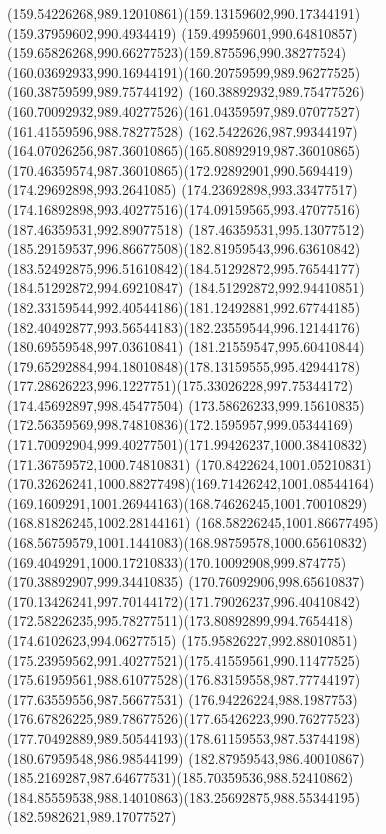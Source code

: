 {    \curveto(159.54226268,989.12010861)(159.13159602,990.17344191)(159.37959602,990.4934419)
    \curveto(159.49959601,990.64810857)(159.65826268,990.66277523)(159.875596,990.38277524)
    \curveto(160.03692933,990.16944191)(160.20759599,989.96277525)(160.38759599,989.75744192)
    \lineto(160.38892932,989.75477526)
    \curveto(160.70092932,989.40277526)(161.04359597,989.07077527)(161.41559596,988.78277528)
    \curveto(162.5422626,987.99344197)(164.07026256,987.36010865)(165.80892919,987.36010865)
    \curveto(170.46359574,987.36010865)(172.92892901,990.5694419)(174.29692898,993.2641085)
    \curveto(174.23692898,993.33477517)(174.16892898,993.40277516)(174.09159565,993.47077516)
    \moveto(187.46359531,992.89077518)
    \curveto(187.46359531,995.13077512)(185.29159537,996.86677508)(182.81959543,996.63610842)
    \curveto(183.52492875,996.51610842)(184.51292872,995.76544177)(184.51292872,994.69210847)
    \curveto(184.51292872,992.94410851)(182.33159544,992.40544186)(181.12492881,992.67744185)
    \curveto(182.40492877,993.56544183)(182.23559544,996.12144176)(180.69559548,997.03610841)
    \curveto(181.21559547,995.60410844)(179.65292884,994.18010848)(178.13159555,995.42944178)
    \curveto(177.28626223,996.1227751)(175.33026228,997.75344172)(174.45692897,998.45477504)
    \curveto(173.58626233,999.15610835)(172.56359569,998.74810836)(172.1595957,999.05344169)
    \curveto(171.70092904,999.40277501)(171.99426237,1000.38410832)(171.36759572,1000.74810831)
    \curveto(170.8422624,1001.05210831)(170.32626241,1000.88277498)(169.71426242,1001.08544164)
    \curveto(169.1609291,1001.26944163)(168.74626245,1001.70010829)(168.81826245,1002.28144161)
    \curveto(168.58226245,1001.86677495)(168.56759579,1001.1441083)(168.98759578,1000.65610832)
    \curveto(169.4049291,1000.17210833)(170.10092908,999.874775)(170.38892907,999.34410835)
    \curveto(170.76092906,998.65610837)(170.13426241,997.70144172)(171.79026237,996.40410842)
    \curveto(172.58226235,995.78277511)(173.80892899,994.7654418)(174.6102623,994.06277515)
    \curveto(175.95826227,992.88010851)(175.23959562,991.40277521)(175.41559561,990.11477525)
    \curveto(175.61959561,988.61077528)(176.83159558,987.77744197)(177.63559556,987.56677531)
    \curveto(176.94226224,988.1987753)(176.67826225,989.78677526)(177.65426223,990.76277523)
    \curveto(177.70492889,989.50544193)(178.61159553,987.53744198)(180.67959548,986.98544199)
    \curveto(182.87959543,986.40010867)(185.2169287,987.64677531)(185.70359536,988.52410862)
    \curveto(184.85559538,988.14010863)(183.25692875,988.55344195)(182.5982621,989.17077527)
}
